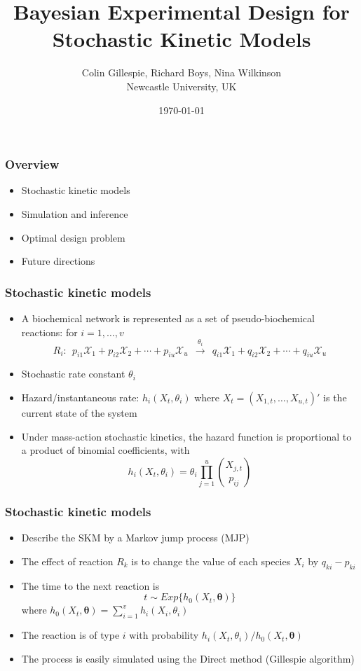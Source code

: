 \documentclass[t,compress]{beamer}
\title[Bayesian Experimental Design for Stochastic Kinetic Models]{Bayesian
  Experimental Design for Stochastic Kinetic Models}
\author[]{Colin Gillespie, Richard Boys, Nina Wilkinson \\
\bigskip
Newcastle University, UK}
\date{\today}
\newcommand{\btheta}{\boldsymbol{\theta}}
\begin{document}
\maketitle

\begin{frame}
\frametitle{Overview}
\begin{itemize}
\item Stochastic kinetic models
\item Simulation and inference
\item Optimal design problem
\item Future directions
\end{itemize}

\end{frame}


\begin{frame}
\frametitle{Stochastic kinetic models}

\begin{itemize}
\item A biochemical network is represented as a set of pseudo-biochemical
reactions: for $i=1, \ldots, v$
\[
R_i:~~ p_{i1}\mathcal{X}_1+p_{i2}\mathcal{X}_2+\cdots+p_{iu}\mathcal{X}_u 
~~ \xrightarrow{\theta_i}~~
q_{i1}\mathcal{X}_1+q_{i2}\mathcal{X}_2+\cdots+q_{iu}\mathcal{X}_u
\]
\item Stochastic rate constant $\theta_i$
\item  Hazard/instantaneous rate: $h_i(X_t, \theta_i)$ where $X_t = (X_{1,t}, \ldots, X_{u,t})′$ is
the current state of the system
\item  Under mass-action stochastic kinetics, the hazard function is proportional to a
product of binomial coefficients, with
\[
h_i(X_t,\theta_i) = \theta_i\prod_{j=1}^u \binom{X_{j,t}}{p_{ij}}
\]
\end{itemize}
\end{frame}

\begin{frame}
\frametitle{Stochastic kinetic models}
\begin{itemize}
\item Describe the SKM by a Markov jump process (MJP)
\item The effect of reaction $R_k$ is to change the value of each species $X_i$ by
$q_{ki} - p_{ki}$
\item The time to the next reaction is
\[
t \sim Exp\{h_0 (X_t , \btheta)\}
\]
where $ h_0(X_t, \btheta) =\sum_{i=1}^v h_i(X_i, \theta_i)$
\item The reaction is of type
$i$ with probability $h_i(X_t, \theta_i)/h_0(X_t , \btheta)$
\item The process is easily simulated using the Direct method (Gillespie algorithm)
\end{itemize}
\end{frame}
\end{document}
